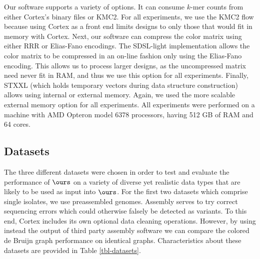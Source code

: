 \documentclass[doctor]{thesis}
\begin{document}
Our software supports a variety of options.  It can consume $k$-mer counts from either Cortex's binary files or KMC2.  For all experiments, we use the KMC2 flow because using Cortex as a front end limits designs to only those that would fit in memory with Cortex.  Next, our software can compress the color matrix using either RRR or Elias-Fano encodings.  The SDSL-light implementation allows the color matrix to be compressed in an on-line fashion only using the Elias-Fano encoding.  This allows us to process larger designs, as the uncompressed matrix need never fit in RAM, and thus we use this option for all experiments.  Finally, STXXL (which holds temporary vectors during data structure construction) allows using internal or external memory.  Again, we used the more scalable external memory option for all experiments.
All experiments were performed on a machine with AMD Opteron model 6378 processors, having 512 GB of RAM and 64 cores. 




\subsection{Datasets} \label{data}



The three different datasets were chosen in order to test and evaluate the performance of $\ours$ on a variety of diverse yet realistic data types that are likely to be used as input into $\ours$.  For the first two datasets which comprise single isolates, we use preassembled genomes.  Assembly serves to try correct sequencing errors which could otherwise falsely be detected as variants. To this end, {\sc Cortex} includes its own optional data cleaning operations.  However, by using instead the output of third party assembly software we can compare the colored de Bruijn graph performance on identical graphs.  Characteristics about these datasets are provided in Table \ref{tbl-datasets}.
\end{document}
